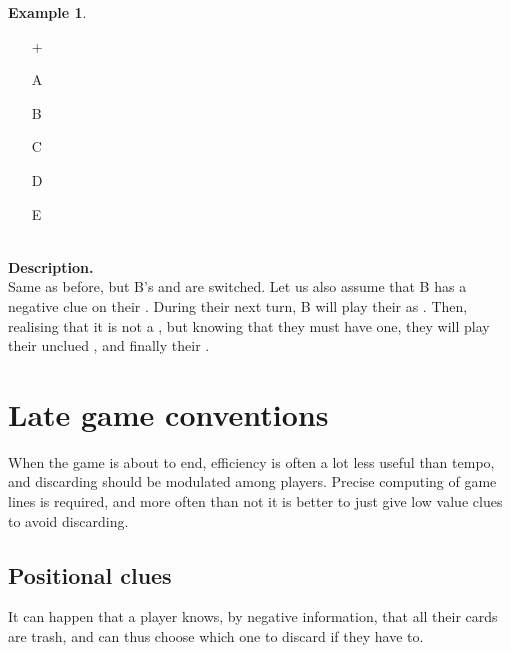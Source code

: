 \documentclass[a4paper]{article}
\theoremstyle{plain}
\theoremstyle{definition}
\newtheorem{example}[theorem]{Example}
\begin{document}
\begin{example}	\hfill \\
	\begin{minipage}{0.45\textwidth}
		\begin{itemize}
			\item[\Large +]      
			\item[\Large A]    
			\item[\Large B]    
			\item[\Large C]    
			\item[\Large D]    
			\item[\Large E]    
		\end{itemize}
	\end{minipage}%
	\begin{minipage}{0.55\textwidth}
		\hfill \\
		
		\textbf{Description.} \\
		
		Same as before, but B's  and  are switched. Let us also assume that B has a negative  clue on their . During their next turn, B will play their  as . Then, realising that it is not a , but knowing that they must have one, they will play their unclued , and finally their .
	\end{minipage}
\end{example} \vspace{0.15 cm}

\section{Late game conventions}
\label{sec:late-game}

When the game is about to end, efficiency is often a lot less useful than tempo, and discarding should be modulated among players. Precise computing of game lines is required, and more often than not it is better to just give low value clues to avoid discarding. 

\subsection{Positional clues}

It can happen that a player knows, by negative information, that all their cards are trash, and can thus choose which one to discard if they have to.
\end{document}
